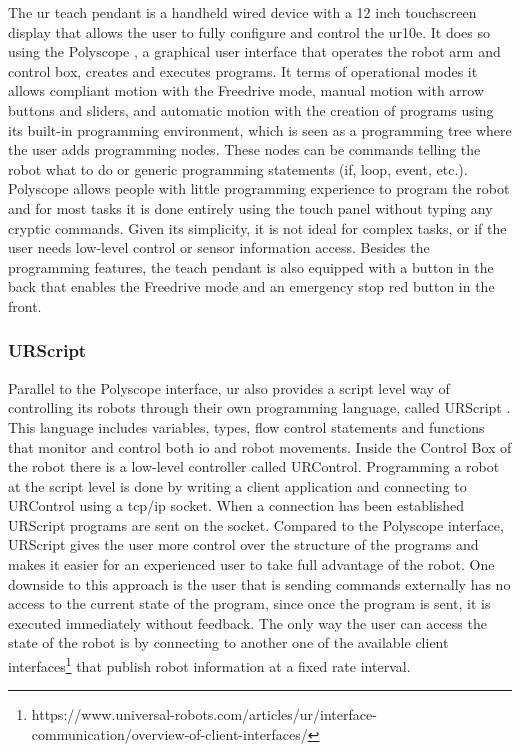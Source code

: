 \par The \ac{ur} teach pendant is a handheld wired device with a 12 inch touchscreen display that allows the user to fully configure and control the \ac{ur10e}. It does so using the Polyscope \cite{ur10e.manual}, a graphical user interface that operates the robot arm and control box, creates and executes programs. It terms of operational modes it allows compliant motion with the Freedrive mode, manual motion with arrow buttons and sliders, and automatic motion with the creation of programs using its built-in programming environment, which is seen as a programming tree where the user adds programming nodes. These nodes can be commands telling the robot what to do or generic programming statements (if, loop, event, etc.). Polyscope allows people with little programming experience to program the robot and for most tasks it is done entirely using the touch panel without typing any cryptic commands. Given its simplicity, it is not ideal for complex tasks, or if the user needs low-level control or sensor information access. Besides the programming features, the teach pendant is also equipped with a button in the back that enables the Freedrive mode and an emergency stop red button in the front.

\subsubsection{URScript}

\par Parallel to the Polyscope interface, \ac{ur} also provides a script level way of controlling its robots through their own programming language, called URScript \cite{urscript.manual}. This language includes variables, types, flow control statements and functions that monitor and control both \acs{io} and robot movements. Inside the Control Box of the robot there is a low-level controller called URControl. Programming a robot at the script level is done by writing a client application and connecting to URControl using a \acs{tcp}/\acs{ip} socket. When a connection has been established URScript programs are sent on the socket. Compared to the Polyscope interface, URScript gives the user more control over the structure of the programs and makes it easier for an experienced user to take full advantage of the robot. One downside to this approach is the user that is sending commands externally has no access to the current state of the program, since once the program is sent, it is executed immediately without feedback. The only way the user can access the state of the robot is by connecting to another one of the available client interfaces\footnote{https://www.universal-robots.com/articles/ur/interface-communication/overview-of-client-interfaces/} that publish robot information at a fixed rate interval.

